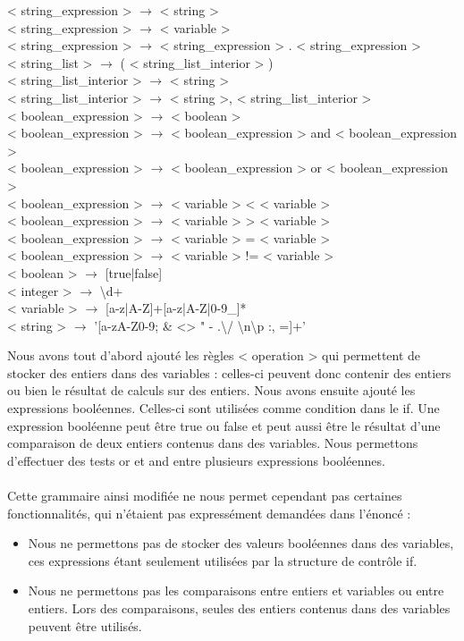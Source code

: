 \documentclass[a4paper,10pt]{article}
\begin{document}
{< string\_expression > $\rightarrow$ < string > \\
< string\_expression > $\rightarrow$ < variable > \\
< string\_expression > $\rightarrow$ < string\_expression > . < string\_expression > \\
< string\_list > $\rightarrow$ ( < string\_list\_interior > ) \\
< string\_list\_interior > $\rightarrow$ < string >\\
< string\_list\_interior > $\rightarrow$ < string >, < string\_list\_interior > \\
< boolean\_expression > $\rightarrow$ < boolean > \\
< boolean\_expression > $\rightarrow$ < boolean\_expression > and < boolean\_expression > \\
< boolean\_expression > $\rightarrow$ < boolean\_expression > or < boolean\_expression > \\
< boolean\_expression > $\rightarrow$ < variable > < < variable >\\
< boolean\_expression > $\rightarrow$ < variable > > < variable >\\
< boolean\_expression > $\rightarrow$ < variable > = < variable >\\
< boolean\_expression > $\rightarrow$ < variable > != < variable >\\
< boolean > $\rightarrow$ [true|false]\\
< integer > $\rightarrow$ \textbackslash d+\\
< variable > $\rightarrow$ [a-z|A-Z]+[a-z|A-Z|0-9\_]*\\
< string > $\rightarrow$ '[a-zA-Z0-9; \& <> " - .\textbackslash / \textbackslash n\textbackslash p :, =]+' \\
}

Nous avons tout d'abord ajouté les règles < operation > qui permettent de stocker des entiers dans des variables : celles-ci peuvent donc contenir des entiers ou bien le résultat
de calculs sur des entiers. \newline Nous avons ensuite ajouté les expressions booléennes. Celles-ci sont utilisées comme condition dans 
le \textrm{if}.
Une expression booléenne peut être \textrm{true} ou \textrm{false} et peut aussi être le résultat d'une comparaison de deux entiers contenus dans des variables. Nous permettons d'effectuer des tests \textrm{or} et \textrm{and} entre plusieurs expressions booléennes.
\\ \\
Cette grammaire ainsi modifiée ne nous permet cependant pas certaines fonctionnalités, qui n'étaient pas expressément demandées dans l'énoncé :
\begin{itemize}
 \item Nous ne permettons pas de stocker des valeurs booléennes dans des variables, ces expressions étant seulement utilisées par la structure de contrôle \textrm{if}. 
 \item Nous ne permettons pas les comparaisons entre entiers et variables ou entre entiers. Lors des comparaisons, seules des entiers contenus dans des variables
 peuvent être utilisés.
\end{itemize}
\end{document}
